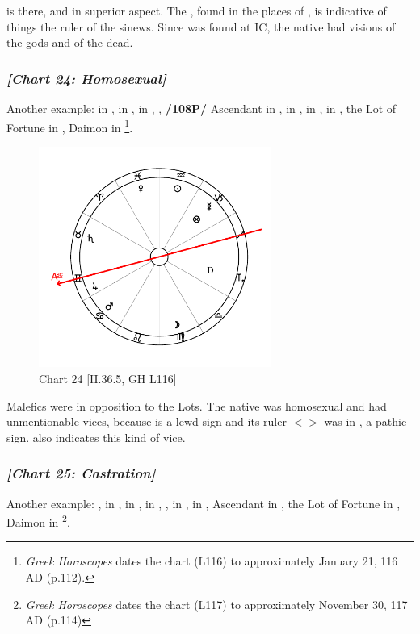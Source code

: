\noindent \Mars\xspace is there, and \Saturn in superior aspect. The \Sun, found in the places of \Jupiter, is indicative of things the ruler of the sinews. Since \Saturn\xspace was found at IC, the native had visions of the gods and of the dead.

\newpage
\clearpage
\subsubsection{\textit{[Chart 24: Homosexual]}}
Another example: \Sun\xspace in \Aquarius, \Moon\xspace in \Virgo, \Saturn\xspace in \Taurus, \Jupiter, \textbf{/108P/} Ascendant in \Gemini, \Mars\xspace in \Cancer, \Venus\xspace in \Pisces, \Mercury\xspace in \Capricorn, the Lot of Fortune in \Capricorn, Daimon in \Scorpio
\footnote{\textit{Greek Horoscopes} dates the chart (L116) to approximately January 21, 116 AD (p.112).}.

\clearpage
\begin{figure}
\centering
\vspace{-30pt}
\includegraphics[width=0.68\textwidth]{charts/2_36_5}
\caption{Chart 24 [II.36.5, GH L116]}
\label{fig:chart24}
\end{figure}

\noindent Malefics were in opposition to the Lots. The native was homosexual and had unmentionable vices, because \Capricorn\xspace is a lewd sign and its ruler $<$\Saturn$>$ was in \Taurus, a pathic sign. \Scorpio\xspace also indicates this kind of vice.

\newpage
\subsubsection{\textit{[Chart 25: Castration]}}
Another example: \Sun, \Venus\xspace in \Sagittarius, \Moon\xspace in \Cancer, \Saturn\xspace in \Gemini, \Jupiter, \Mars\xspace in \Leo, \Mercury\xspace in \Scorpio, Ascendant in \Capricorn, the Lot of Fortune in \Leo, Daimon in \Gemini
\footnote{\textit{Greek Horoscopes} dates the chart (L117) to approximately November 30, 117 AD (p.114)}. 

